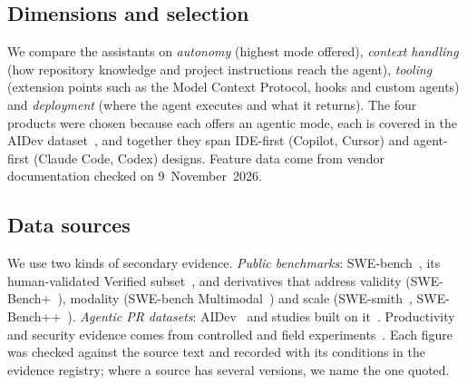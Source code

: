 \documentclass[conference]{IEEEtran}
\begin{document}
\subsection{Dimensions and selection}
We compare the assistants on \emph{autonomy} (highest mode offered), \emph{context handling} (how
repository knowledge and project instructions reach the agent), \emph{tooling} (extension points such as
the Model Context Protocol, hooks and custom agents) and \emph{deployment} (where the agent executes and
what it returns). The four products were chosen because each offers an agentic mode, each is covered in
the AIDev dataset~\cite{li2026aidev}, and together they span IDE-first (Copilot, Cursor) and agent-first
(Claude Code, Codex) designs. Feature data come from vendor documentation checked on 9~November~2026.

\subsection{Data sources}
We use two kinds of secondary evidence. \emph{Public benchmarks}: SWE-bench~\cite{jimenez2024swebench},
its human-validated Verified subset~\cite{openai2024verified}, and derivatives that address validity
(SWE-Bench+~\cite{aleithan2024swebenchplus}), modality (SWE-bench Multimodal~\cite{yang2025multimodal})
and scale (SWE-smith~\cite{yang2025swesmith}, SWE-Bench++~\cite{wang2025swebenchpp}). \emph{Agentic PR
datasets}: AIDev~\cite{li2026aidev} and studies built on it~\cite{li2025teammates,rahman2026,mazloomzadeh2026,pinna2026,cynthia2026postmerge,cynthia2026core}.
Productivity and security evidence comes from controlled and field experiments~\cite{peng2023copilot,cui2025effects,perry2023insecure,pearce2025asleep}.
Each figure was checked against the source text and recorded with its conditions in the evidence registry;
where a source has several versions, we name the one quoted.
\end{document}
